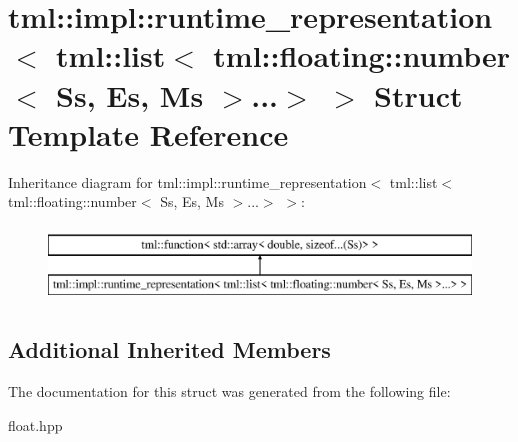 \hypertarget{structtml_1_1impl_1_1runtime__representation_3_01tml_1_1list_3_01tml_1_1floating_1_1number_3_01S4ca35eaba673f46b334959c1c695250b}{\section{tml\+:\+:impl\+:\+:runtime\+\_\+representation$<$ tml\+:\+:list$<$ tml\+:\+:floating\+:\+:number$<$ Ss, Es, Ms $>$...$>$ $>$ Struct Template Reference}
\label{structtml_1_1impl_1_1runtime__representation_3_01tml_1_1list_3_01tml_1_1floating_1_1number_3_01S4ca35eaba673f46b334959c1c695250b}
}
Inheritance diagram for tml\+:\+:impl\+:\+:runtime\+\_\+representation$<$ tml\+:\+:list$<$ tml\+:\+:floating\+:\+:number$<$ Ss, Es, Ms $>$...$>$ $>$\+:\begin{figure}[H]
\begin{center}
\leavevmode
\includegraphics[height=2.000000cm]{structtml_1_1impl_1_1runtime__representation_3_01tml_1_1list_3_01tml_1_1floating_1_1number_3_01S4ca35eaba673f46b334959c1c695250b}
\end{center}
\end{figure}
\subsection*{Additional Inherited Members}


The documentation for this struct was generated from the following file\+:\begin{DoxyCompactItemize}
\item 
float.\+hpp\end{DoxyCompactItemize}
